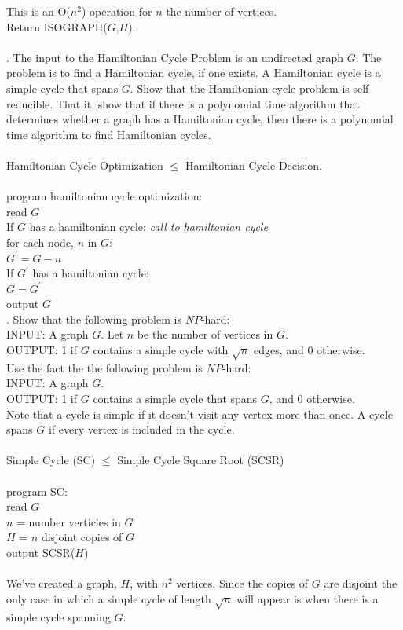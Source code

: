 \documentclass[10pt]{article}
\newcommand{\tab}{\hspace*{2em}}
\newcommand{\tabb}{\hspace*{4em}}
\newcommand{\tabbb}{\hspace*{6em}}
\newcommand{\tabbbb}{\hspace*{8em}}
\begin{document}
		This is an O($n^2$) operation for $n$ the number of vertices.\\
		Return ISOGRAPH($G$,$H$).\\
		\\
		. The input to the Hamiltonian Cycle Problem is an undirected graph $G$. The problem is to find a
		Hamiltonian cycle, if one exists. A Hamiltonian cycle is a simple cycle that spans $G$. Show that the
		Hamiltonian cycle problem is self reducible. That it, show that if there is a polynomial time algorithm
		that determines whether a graph has a Hamiltonian cycle, then there is a polynomial time algorithm
		to find Hamiltonian cycles.
		\\
		\\
		Hamiltonian Cycle Optimization $\leq$ Hamiltonian Cycle Decision.\\
		\\
		program hamiltonian cycle optimization:\\
		\tab read $G$\\
		\tab If $G$ has a hamiltonian cycle: \emph{call to hamiltonian cycle}\\ 
		\tabb for each node, $n$ in $G$:\\
		\tabbb $G^\prime = G - n$\\
		\tabbb If $G^\prime$ has a hamiltonian cycle:\\
		\tabbbb $G = G^\prime$\\
		\tab output $G$
		\\
		. Show that the following problem is $NP$-hard:\\
		INPUT: A graph $G$. Let $n$ be the number of vertices in $G$.\\
		OUTPUT: 1 if $G$ contains a simple cycle with $\sqrt{n}$ edges, and 0 otherwise.\\
		Use the fact the the following problem is $NP$-hard:\\
		INPUT: A graph $G$.\\
		OUTPUT: 1 if $G$ contains a simple cycle that spans $G$, and 0 otherwise.\\
		Note that a cycle is simple if it doesn’t visit any vertex more than once. A cycle spans $G$ if every
		vertex is included in the cycle.\\
		\\
		Simple Cycle (SC) $\leq$ Simple Cycle Square Root (SCSR)\\
		\\
		program SC:\\
		\tab read $G$\\
		\tab $n$ = number verticies in $G$\\
		\tab $H$ = $n$ disjoint copies of $G$\\
		\tab output SCSR($H$)\\
		\\
		We've created a graph, $H$, with $n^2$ vertices. Since the copies of $G$ are disjoint the only case in which a simple cycle of 
		length $\sqrt{n}$ will appear is when there is a simple cycle spanning $G$.
\end{document}
